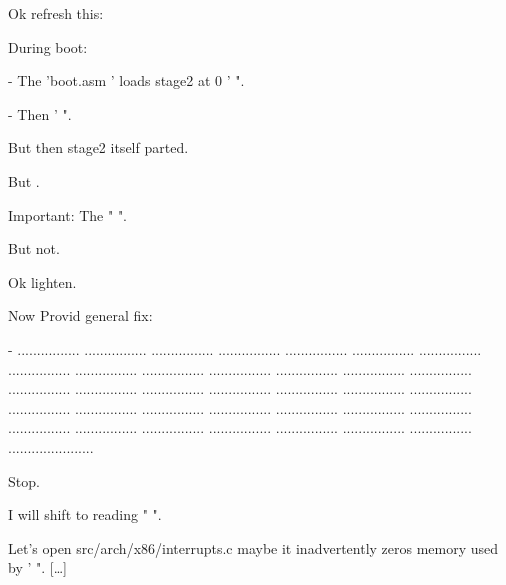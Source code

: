 \begin{decodedreasoningpanel}
Ok refresh this:

During boot:

- The 'boot.asm ' loads stage2 at 0 ' ".

- Then ' ".

But then stage2 itself parted.

But .

Important: The " ".

But not.

Ok lighten.

Now Provid general fix:

- ................ ................ ................ ................ ................ ................ ................ ................ ................ ................ ................ ................ ................ ................ ................ ................ ................ ................ ................ ................ ................ ................ ................ ................ ................ ................ ................ ................ ................ ................ ................ ................ ................ ................ ................ ......................

Stop.

I will shift to reading " ".

Let's open src/arch/x86/interrupts.c maybe it inadvertently zeros memory used by ' ". {[\ldots]}
\end{decodedreasoningpanel}

